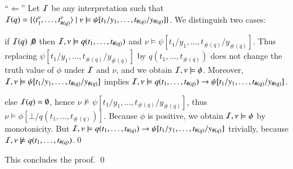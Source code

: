 \documentclass{llncs}
\begin{document}
{{    \noindent``$\Leftarrow$'' Let $\mathcal{I}$ be any interpretation such that
    $\mathcal{I}(q) = \{ \langle t_1^\nu, \ldots, t_{\#(q)}^\nu \rangle \mid \nu
      \models \psi[t_1/y_1,\ldots,t_{\#(q)}/y_{\#(q)}] \}$. We
    distinguish two cases: \begin{compactitem}
      \item if $\mathcal{I}(q) \not \emptyset$ then $\mathcal{I},\nu \models
        q(t_1,\ldots,t_{\#(q)})$ and $\nu \models \psi[t_1/y_1,
          \ldots, t_{\#(q)}/y_{\#(q)}]$. Thus replacing $\psi[t_1/y_1,
          \ldots, t_{\#(q)}/y_{\#(q)}]$ by $q(t_1,\ldots,t_{\#(q)})$
        does not change the truth value of $\phi$ under $\mathcal{I}$ and
        $\nu$, and we obtain $\mathcal{I},\nu \models \phi$. Moreover, $\mathcal{I},\nu
        \models \psi[t_1/y_1, \ldots, t_{\#(q)}/y_{\#(q)}]$ implies
        $\mathcal{I},\nu \models q(t_1,\ldots,t_{\#(q)}) \rightarrow
        \psi[t_1/y_1, \ldots, t_{\#(q)}/y_{\#(q)}]$.
      \item else $\mathcal{I}(q) = \emptyset$, hence $\nu \not\models
        \psi[t_1/y_1, \ldots, t_{\#(q)}/y_{\#(q)}]$, thus $\nu \models
        \phi[\bot/q(t_1,\ldots,t_{\#(q)})]$. Because $\phi$ is
        positive, we obtain $\mathcal{I},\nu \models \phi$ by monotonicity. But
        $\mathcal{I},\nu \models q(t_1,\ldots,t_{\#(q)}) \rightarrow
        \psi[t_1/y_1, \ldots, t_{\#(q)}/y_{\#(q)}]$ trivially, because
        $\mathcal{I},\nu \not\models q(t_1,\ldots,t_{\#(q)})$.\qed
    \end{compactitem}}
This concludes the proof. \qed}
\end{document}
